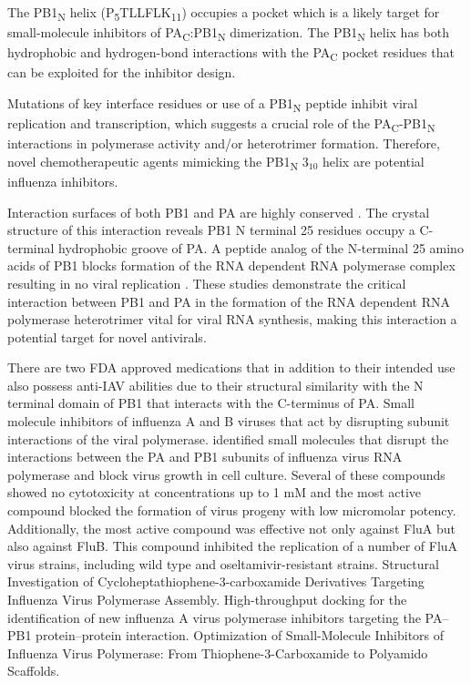 The PB1\textsubscript{N} helix (P\textsubscript{5}TLLFLK\textsubscript{11}) occupies a pocket which is a likely target for small-molecule inhibitors of PA\textsubscript{C}:PB1\textsubscript{N} dimerization. The PB1\textsubscript{N} helix has both hydrophobic and hydrogen-bond interactions with the PA\textsubscript{C} pocket residues that can be exploited for the inhibitor design.

Mutations of key interface residues or use of a PB1\textsubscript{N} peptide inhibit viral replication and transcription, which suggests a crucial role of the PA\textsubscript{C}-PB1\textsubscript{N} interactions in polymerase activity and/or heterotrimer formation. Therefore, novel chemotherapeutic agents mimicking the PB1\textsubscript{N} $3_{10}$ helix are potential influenza inhibitors.

Interaction surfaces of both PB1 and PA are highly conserved \citep{1540,1141,1575}. The crystal structure of this interaction reveals PB1 N terminal 25 residues occupy a C-terminal hydrophobic groove of PA. A peptide analog of the N-terminal 25 amino acids of PB1 blocks formation of the RNA dependent RNA polymerase complex resulting in no viral replication \citep{1234,1575}. These studies demonstrate the critical interaction between PB1 and PA in the formation of the RNA dependent RNA polymerase heterotrimer vital for viral RNA synthesis, making this interaction a potential target for novel antivirals.

\citep{1576} There are two FDA approved medications that in addition to their intended use also possess anti-IAV abilities due to their structural similarity with the N terminal domain of PB1 that interacts with the C-terminus of PA.%
\citep{1235} Small molecule inhibitors of influenza A and B viruses that act by disrupting subunit interactions of the viral polymerase. identified small molecules that disrupt the interactions between the PA and PB1 subunits of influenza virus RNA polymerase and block virus growth in cell culture. Several of these compounds showed no cytotoxicity at concentrations up to 1 mM and the most active compound blocked the formation of virus progeny with low micromolar potency. Additionally, the most active compound was effective not only against FluA but also against FluB. This compound inhibited the replication of a number of FluA virus strains, including wild type and oseltamivir-resistant strains.%
\citep{1550} Structural Investigation of Cycloheptathiophene-3-carboxamide Derivatives Targeting Influenza Virus Polymerase Assembly.%
\citep{1542} High-throughput docking for the identification of new influenza A virus polymerase inhibitors targeting the PA–PB1 protein–protein interaction.%
\citep{1527} Optimization of Small-Molecule Inhibitors of Influenza Virus Polymerase: From Thiophene-3-Carboxamide to Polyamido Scaffolds.%

